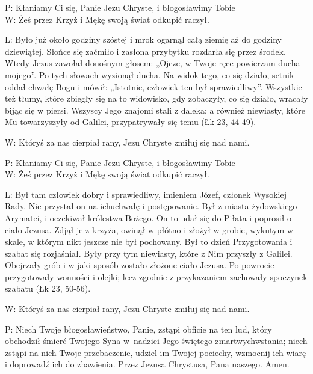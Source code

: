 ﻿\documentclass[9pt,twoside]{extarticle}
\begin{document}
{\hnr{}}


{\hnr P:} Kłaniamy Ci się, Panie Jezu Chryste, i błogosławimy Tobie\\
{\hnr W:} Żeś przez Krzyż i Mękę swoją świat odkupić raczył.


{\hnr L:} Było już około godziny szóstej i mrok ogarnął całą ziemię aż do godziny dziewiątej. Słońce się zaćmiło i zasłona przybytku rozdarła się przez środek. Wtedy Jezus zawołał donośnym głosem: „Ojcze, w Twoje ręce powierzam ducha mojego”. Po tych słowach wyzionął ducha. Na widok tego, co się działo, setnik oddał chwałę Bogu i mówił: „Istotnie, człowiek ten był sprawiedliwy”. Wszystkie też tłumy, które zbiegły się na to widowisko, gdy zobaczyły, co się działo, wracały bijąc się w piersi.  Wszyscy Jego znajomi stali z daleka; a również niewiasty, które Mu towarzyszyły od Galilei, przypatrywały się temu (Łk 23, 44-49).


{\hnr W:} Któryś za nas cierpiał rany, Jezu Chryste zmiłuj się nad nami.


{\hnr{}}


{\hnr P:} Kłaniamy Ci się, Panie Jezu Chryste, i błogosławimy Tobie\\
{\hnr W:} Żeś przez Krzyż i Mękę swoją świat odkupić raczył.


{\hnr L:} Był tam człowiek dobry i sprawiedliwy, imieniem Józef, członek Wysokiej Rady.  Nie przystał on na ich\linebreak uchwałę i postępowanie. Był z miasta żydowskiego Arymatei, i oczekiwał królestwa Bożego.  On to udał się do Piłata i poprosił o ciało Jezusa. Zdjął je z krzyża, owinął w płótno i złożył w grobie, wykutym w skale, w którym nikt jeszcze nie był pochowany. Był to dzień Przygotowania i szabat się rozjaśniał. Były przy tym niewiasty, które z Nim przyszły z Galilei. Obejrzały grób i w jaki sposób zostało złożone ciało Jezusa. Po powrocie przygotowały wonności i olejki; lecz zgodnie z przykazaniem zachowały spoczynek szabatu (Łk 23, 50-56).


{\hnr W:} Któryś za nas cierpiał rany, Jezu Chryste zmiłuj się nad nami.


{\hnr{}}


{\hnr P:} Niech Twoje błogosławieństwo, Panie, zstąpi obficie na ten lud, który obchodził śmierć Twojego Syna w~nadziei Jego świętego zmartwychwstania; niech zstąpi na nich Twoje przebaczenie, udziel im Twojej pociechy, wzmocnij ich wiarę i doprowadź ich do zbawienia. Przez Jezusa Chrystusa, Pana naszego. Amen.
\end{document}
